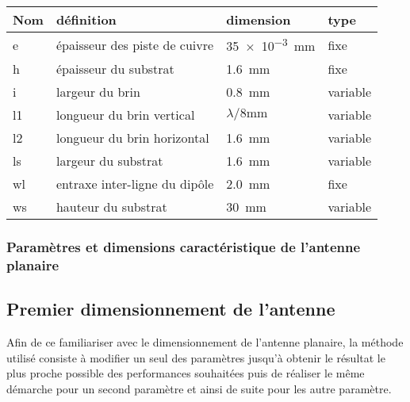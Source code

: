 \documentclass[Deriaz_Traiber_Labo02]{subfiles}
\begin{document}
\begin{table}[H]
\centering
\begin{tabular}{ l  l  l l}
Nom & définition & dimension & type \\ \hline
e  & épaisseur des piste de cuivre & \SI{35e-3}{\milli\meter} & fixe \\
h  & épaisseur du substrat & \SI{1.6}{\milli\meter} & fixe \\
i  & largeur du brin & \SI{0.8}{\milli\meter} & variable \\
l1 & longueur du brin vertical & $\lambda / 8 \si{\milli\meter}$ & variable \\
l2 & longueur du brin horizontal & \SI{1.6}{\milli\meter} & variable \\
ls & largeur du substrat & \SI{1.6}{\milli\meter} & variable \\
wl & entraxe inter-ligne du dipôle & \SI{2.0}{\milli\meter} & fixe \\
ws & hauteur du substrat & \SI{30}{\milli\meter} &  variable \\
\end{tabular}
\end{table}


\subsubsection{Paramètres et dimensions caractéristique de l'antenne planaire}



\subsection{Premier dimensionnement de l'antenne}

Afin de ce familiariser avec le dimensionnement de l'antenne planaire, la méthode utilisé consiste à modifier un seul des paramètres jusqu'à obtenir le résultat le plus proche possible des performances souhaitées puis de réaliser le même démarche pour un second paramètre et ainsi de suite pour les autre paramètre.
\end{document}
